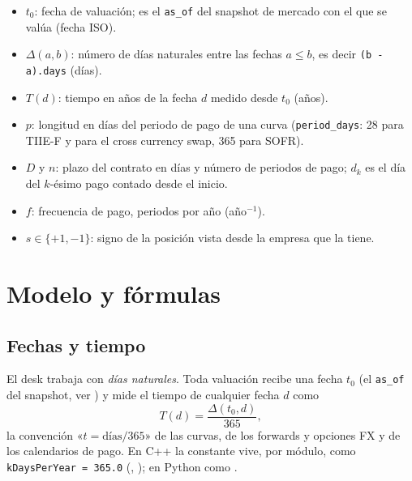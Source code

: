 \begin{sloppypar}
\begin{itemize}
  \item $t_0$: fecha de valuación; es el \texttt{as\_of} del snapshot de mercado con el que se valúa (fecha ISO).
  \item $\Delta(a,b)$: número de días naturales entre las fechas $a\le b$, es decir \texttt{(b - a).days} (días).
  \item $T(d)$: tiempo en años de la fecha $d$ medido desde $t_0$ (años).
  \item $p$: longitud en días del periodo de pago de una curva (\texttt{period\_days}: 28 para TIIE-F y para el cross currency swap, 365 para SOFR).
  \item $D$ y $n$: plazo del contrato en días y número de periodos de pago; $d_k$ es el día del $k$-ésimo pago contado desde el inicio.
  \item $f$: frecuencia de pago, periodos por año (año$^{-1}$).
  \item $s\in\{+1,-1\}$: signo de la posición vista desde la empresa que la tiene.
\end{itemize}

\section{Modelo y fórmulas}\label{sec:cap01-modelo}

\subsection{Fechas y tiempo}\label{sec:cap01-fechas}

El desk trabaja con \emph{días naturales}. Toda valuación recibe una fecha $t_0$ (el \texttt{as\_of} del
snapshot, ver ) y mide el tiempo de cualquier fecha $d$ como
\begin{equation}\label{eq:cap01-tiempo}
  T(d) = \frac{\Delta(t_0,d)}{365},
\end{equation}
la convención «$t=\text{días}/365$» de las curvas, de los forwards y opciones FX y de los calendarios de pago.
En C++ la constante vive, por módulo, como \texttt{kDaysPerYear = 365.0}
(, );
en Python como .


\end{sloppypar}
